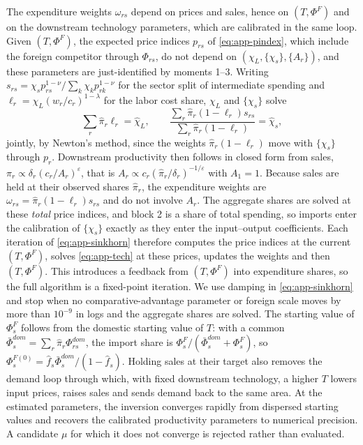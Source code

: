The expenditure weights $\omega_{rs}$ depend on prices and sales, hence on $(T,\Phi^F)$ and on the downstream technology parameters, which are calibrated in the same loop. Given $(T,\Phi^F)$, the expected price indices $p_{rs}$ of \eqref{eq:app-pindex}, which include the foreign competitor through $\Phi_{rs}$, do not depend on $(\chi_L,\{\chi_s\},\{A_r\})$, and these parameters are just-identified by moments 1--3. Writing $s_{rs}=\chi_sp_{rs}^{1-\nu}/\sum_k\chi_kp_{rk}^{1-\nu}$ for the sector split of intermediate spending and $\ell_r=\chi_L(w_r/c_r)^{1-\lambda}$ for the labor cost share, $\chi_L$ and $\{\chi_s\}$ solve
\begin{equation}
\sum_r\hat\pi_r\ell_r=\hat\chi_L,
\qquad
\frac{\sum_r\hat\pi_r(1-\ell_r)s_{rs}}{\sum_r\hat\pi_r(1-\ell_r)}=\hat\chi_s,
\label{eq:app-tech}
\end{equation}
jointly, by Newton's method, since the weights $\hat\pi_r(1-\ell_r)$ move with $\{\chi_s\}$ through $p_r$. Downstream productivity then follows in closed form from sales, $\pi_r\propto\delta_r(c_r/A_r)^{\varepsilon}$, that is $A_r\propto c_r(\hat\pi_r/\delta_r)^{-1/\varepsilon}$ with $A_1=1$. Because sales are held at their observed shares $\hat\pi_r$, the expenditure weights are $\omega_{rs}=\hat\pi_r(1-\ell_r)s_{rs}$ and do not involve $A_r$. The aggregate shares are solved at these \emph{total} price indices, and block 2 is a share of total spending, so imports enter the calibration of $\{\chi_s\}$ exactly as they enter the input--output coefficients. Each iteration of \eqref{eq:app-sinkhorn} therefore computes the price indices at the current $(T,\Phi^F)$, solves \eqref{eq:app-tech} at these prices, updates the weights and then $(T,\Phi^F)$. This introduces a feedback from $(T,\Phi^F)$ into expenditure shares, so the full algorithm is a fixed-point iteration. We use damping in \eqref{eq:app-sinkhorn} and stop when no comparative-advantage parameter or foreign scale moves by more than $10^{-9}$ in logs and the aggregate shares are solved. The starting value of $\Phi^F_s$ follows from the domestic starting value of $T$: with a common $\bar\Phi^{dom}_s=\sum_r\hat\pi_r\Phi^{dom}_{rs}$, the import share is $\Phi^F_s/(\bar\Phi^{dom}_s+\Phi^F_s)$, so $\Phi^{F(0)}_s=\hat f_s\bar\Phi^{dom}_s/(1-\hat f_s)$. Holding sales at their target also removes the demand loop through which, with fixed downstream technology, a higher $T$ lowers input prices, raises sales and sends demand back to the same area. At the estimated parameters, the inversion converges rapidly from dispersed starting values and recovers the calibrated productivity parameters to numerical precision. A candidate $\mu$ for which it does not converge is rejected rather than evaluated. 

